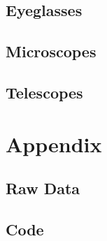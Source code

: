 \documentclass[12pt]{article}
\begin{document}
\subsection{Eyeglasses}

\subsection{Microscopes}

\subsection{Telescopes}

\newpage



 \label{sec:ref}

\newpage

\section*{Appendix} \label{sec:A}

\listoffigures

\listoftables

\subsection*{Raw Data}



\subsection*{Code}
\end{document}
